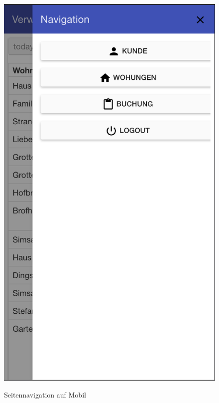 \begin{figure}[H]
\begin{minipage}[t]{0.49\linewidth}
        \centering
        \includegraphics[width=\linewidth]{images/frontend_header_small_navigation.png}
        \label{frontend_header_small_navigation}
        \caption{Seitennavigation auf Mobil}
    \end{minipage}
\end{figure}


